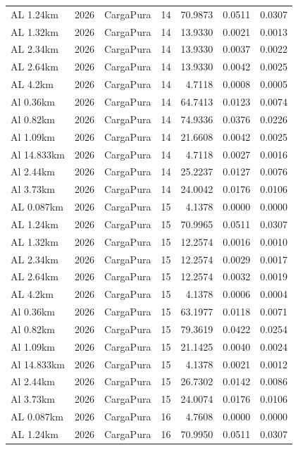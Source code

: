 \documentclass[11pt,a4paper]{article}
\begin{document}
\begin{longtable}{llllrrr}
AL 1.24km & 2026 & CargaPura & 14 & 70.9873 & 0.0511 & 0.0307 \\
AL 1.32km & 2026 & CargaPura & 14 & 13.9330 & 0.0021 & 0.0013 \\
AL 2.34km & 2026 & CargaPura & 14 & 13.9330 & 0.0037 & 0.0022 \\
AL 2.64km & 2026 & CargaPura & 14 & 13.9330 & 0.0042 & 0.0025 \\
AL 4.2km & 2026 & CargaPura & 14 & 4.7118 & 0.0008 & 0.0005 \\
Al 0.36km & 2026 & CargaPura & 14 & 64.7413 & 0.0123 & 0.0074 \\
Al 0.82km & 2026 & CargaPura & 14 & 74.9336 & 0.0376 & 0.0226 \\
Al 1.09km & 2026 & CargaPura & 14 & 21.6608 & 0.0042 & 0.0025 \\
Al 14.833km & 2026 & CargaPura & 14 & 4.7118 & 0.0027 & 0.0016 \\
Al 2.44km & 2026 & CargaPura & 14 & 25.2237 & 0.0127 & 0.0076 \\
Al 3.73km & 2026 & CargaPura & 14 & 24.0042 & 0.0176 & 0.0106 \\
AL 0.087km & 2026 & CargaPura & 15 & 4.1378 & 0.0000 & 0.0000 \\
AL 1.24km & 2026 & CargaPura & 15 & 70.9965 & 0.0511 & 0.0307 \\
AL 1.32km & 2026 & CargaPura & 15 & 12.2574 & 0.0016 & 0.0010 \\
AL 2.34km & 2026 & CargaPura & 15 & 12.2574 & 0.0029 & 0.0017 \\
AL 2.64km & 2026 & CargaPura & 15 & 12.2574 & 0.0032 & 0.0019 \\
AL 4.2km & 2026 & CargaPura & 15 & 4.1378 & 0.0006 & 0.0004 \\
Al 0.36km & 2026 & CargaPura & 15 & 63.1977 & 0.0118 & 0.0071 \\
Al 0.82km & 2026 & CargaPura & 15 & 79.3619 & 0.0422 & 0.0254 \\
Al 1.09km & 2026 & CargaPura & 15 & 21.1425 & 0.0040 & 0.0024 \\
Al 14.833km & 2026 & CargaPura & 15 & 4.1378 & 0.0021 & 0.0012 \\
Al 2.44km & 2026 & CargaPura & 15 & 26.7302 & 0.0142 & 0.0086 \\
Al 3.73km & 2026 & CargaPura & 15 & 24.0074 & 0.0176 & 0.0106 \\
AL 0.087km & 2026 & CargaPura & 16 & 4.7608 & 0.0000 & 0.0000 \\
AL 1.24km & 2026 & CargaPura & 16 & 70.9950 & 0.0511 & 0.0307 \\

\end{longtable}
\end{document}
